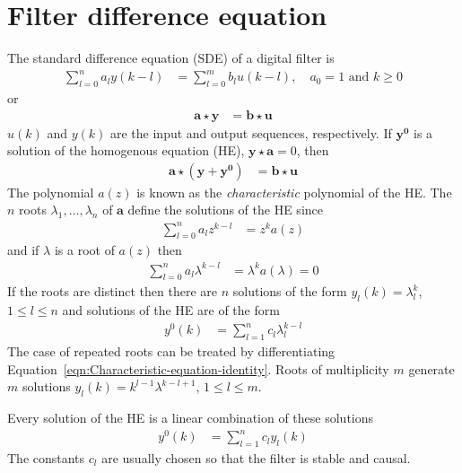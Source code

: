 \documentclass[a4paper,twoside,10pt,english]{report}
\begin{document}
\section{Filter difference equation}
The standard difference equation (SDE) of a digital filter is
\begin{align}
\sum^{n}_{l=0}a_{l}y\left(k-l\right) &= \sum^{m}_{l=0}b_{l}u\left(k-l\right),
\quad a_{0}=1\text{ and }k\ge 0
\label{eqn:Standard-difference-equation}
\end{align}
or
\begin{align*}
\boldsymbol{a}\star\boldsymbol{y} &= 
\boldsymbol{b}\star\boldsymbol{u}
\end{align*}
$u\left(k\right)$ and $y\left(k\right)$ are the input and output 
sequences, respectively. If $\boldsymbol{y^{0}}$ is a solution of the 
homogenous equation (HE), $\boldsymbol{y}\star\boldsymbol{a} = 0$, then
\begin{align*}
\boldsymbol{a}\star\left(\boldsymbol{y}+\boldsymbol{y^{0}}\right) &=
 \boldsymbol{b}\star\boldsymbol{u}
\end{align*}
The polynomial $a\left(z\right)$ is known as the \emph{characteristic}
polynomial of the HE. The $n$ roots $\lambda_{1},\hdots,\lambda_{n}$ of 
$\boldsymbol{a}$ define the solutions of the HE since
\begin{align*}
\sum^{n}_{l=0}a_{l}z^{k-l}&=z^{k}a\left(z\right)
\end{align*}
and if $\lambda$ is a root of $a\left(z\right)$ then
\begin{align}
\sum^{n}_{l=0}a_{l}\lambda^{k-l}&=\lambda^{k}a\left(\lambda\right)=0
\label{eqn:Characteristic-equation-identity}
\end{align}
If the roots are distinct then there are $n$ solutions of the form 
$y_{l}\left(k\right)=\lambda_{l}^{k}$, $1\le l \le n$ and solutions of the 
HE are of the form
\begin{align*}
y^{0}\left(k\right) &=\sum^{n}_{l=1}c_{l}\lambda_{l}^{k-l}
\end{align*}
The case of repeated roots can be treated by differentiating 
Equation~\ref{eqn:Characteristic-equation-identity}. Roots of multiplicity $m$
generate $m$ solutions $y_{l}\left(k\right)=k^{l-1}\lambda^{k-l+1}$, 
$1\le l \le m$. 

Every solution of the HE is a linear combination of these solutions
\begin{align*}
y^{0}\left(k\right) &=\sum^{n}_{l=1}c_{l}y_{l}\left(k\right)
\end{align*}
The constants $c_{l}$ are usually chosen so that the filter is stable and 
causal. 
\end{document}
